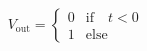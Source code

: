 \[
  V_{\mathrm{out}}
  = \begin{cases}
    0 &\text{if} \quad t < 0\\
    1 &\text{else}
  \end{cases}
\]